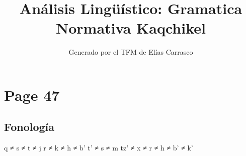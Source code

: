 \documentclass{article}%
\title{Análisis Lingüístico: Gramatica Normativa Kaqchikel}%
\author{Generado por el TFM de Elías Carrasco}%
\begin{document}
%
\normalsize%
\maketitle%
\section{Page 47}%
\label{sec:Page47}%
\subsection{Fonología}%
\label{subsec:Fonologa}%

%
q ≠ s ≠ t ≠ j %
r ≠ k ≠ h ≠ b’ %
t’ ≠ s ≠ m %
tz’ ≠ x ≠ r ≠ h ≠ b’ ≠ k’ 

%
\end{document}
